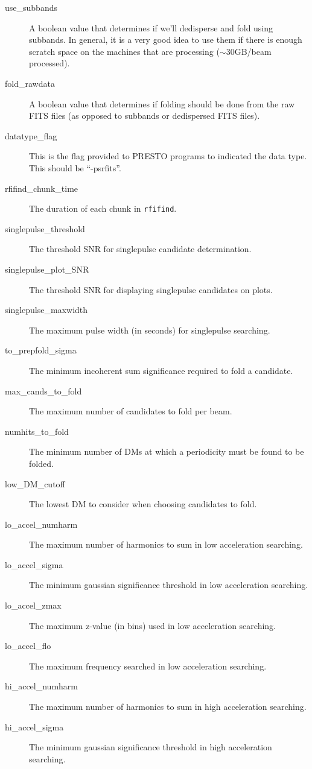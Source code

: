 \begin{description}
    \item[use\_subbands] A boolean value that determines if we'll dedisperse and fold using subbands. In general, it is a very good idea to use them if there is enough scratch space on the machines that are processing ($\sim$30GB/beam processed).
    \item[fold\_rawdata] A boolean value that determines if folding should be done from the raw FITS files (as opposed to subbands or dedispersed FITS files).
    \item[datatype\_flag] This is the flag provided to PRESTO programs to indicated the data type. This should be ``-psrfits''.
    \item[rfifind\_chunk\_time] The duration of each chunk in \texttt{rfifind}.
    \item[singlepulse\_threshold] The threshold SNR for singlepulse candidate determination.
    \item[singlepulse\_plot\_SNR] The threshold SNR for displaying singlepulse candidates on plots.
    \item[singlepulse\_maxwidth] The maximum pulse width (in seconds) for singlepulse searching.
    \item[to\_prepfold\_sigma] The minimum incoherent sum significance required to fold a candidate.
    \item[max\_cands\_to\_fold] The maximum number of candidates to fold per beam.
    \item[numhits\_to\_fold] The minimum number of DMs at which a periodicity must be found to be folded.
    \item[low\_DM\_cutoff] The lowest DM to consider when choosing candidates to fold.
    \item[lo\_accel\_numharm] The maximum number of harmonics to sum in low acceleration searching.
    \item[lo\_accel\_sigma] The minimum gaussian significance threshold in low acceleration searching.
    \item[lo\_accel\_zmax] The maximum z-value (in bins) used in low acceleration searching.
    \item[lo\_accel\_flo] The maximum frequency searched in low acceleration searching.
    \item[hi\_accel\_numharm] The maximum number of harmonics to sum in high acceleration searching.
    \item[hi\_accel\_sigma] The minimum gaussian significance threshold in high acceleration searching.

\end{description}
